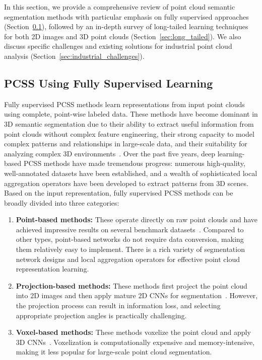 \documentclass[preprint,12pt]{elsarticle}
\begin{document}
In this section, we provide a comprehensive review of point cloud semantic segmentation methods with particular emphasis on fully supervised approaches (Section~\ref{sec:fully_supervised}), followed by an in-depth survey of long-tailed learning techniques for both 2D images and 3D point clouds (Section~\ref{sec:long_tailed}). We also discuss specific challenges and existing solutions for industrial point cloud analysis (Section~\ref{sec:industrial_challenges}).

\subsection{PCSS Using Fully Supervised Learning}
\label{sec:fully_supervised}

Fully supervised PCSS methods learn representations from input point clouds using complete, point-wise labeled data. These methods have become dominant in 3D semantic segmentation due to their ability to extract useful information from point clouds without complex feature engineering, their strong capacity to model complex patterns and relationships in large-scale data, and their suitability for analyzing complex 3D environments~\cite{guo2020deep}. Over the past five years, deep learning-based PCSS methods have made tremendous progress: numerous high-quality, well-annotated datasets have been established, and a wealth of sophisticated local aggregation operators have been developed to extract patterns from 3D scenes. Based on the input representation, fully supervised PCSS methods can be broadly divided into three categories:
\begin{enumerate}
    \item \textbf{Point-based methods:} These operate directly on raw point clouds and have achieved impressive results on several benchmark datasets~\cite{qi2017pointnet, hu2020randla, yin2021paconv}. Compared to other types, point-based networks do not require data conversion, making them relatively easy to implement. There is a rich variety of segmentation network designs and local aggregation operators for effective point cloud representation learning.
    \item \textbf{Projection-based methods:} These methods first project the point cloud into 2D images and then apply mature 2D CNNs for segmentation~\cite{qi2016volumetric}. However, the projection process can result in information loss, and selecting appropriate projection angles is practically challenging.
    \item \textbf{Voxel-based methods:} These methods voxelize the point cloud and apply 3D CNNs~\cite{graham2017submanifold}. Voxelization is computationally expensive and memory-intensive, making it less popular for large-scale point cloud segmentation.
\end{enumerate}
\end{document}

